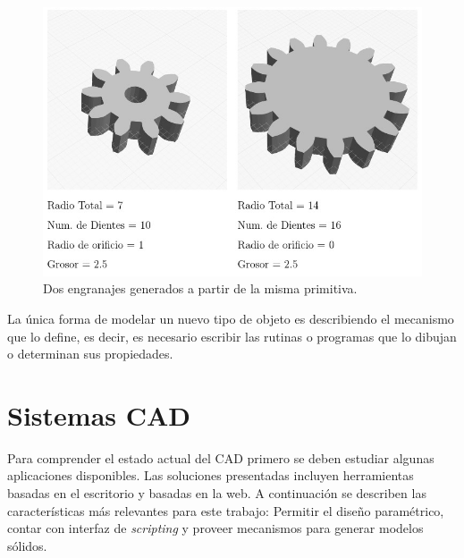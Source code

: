 \newline


\begin{figure}[h]
\includegraphics[width=12cm]{Img/Modelos/engranaje.jpg}
\centering
\caption{\footnotesize{Dos engranajes generados a partir de la misma primitiva.}}
\label{fig:csg4}
\end{figure}

La única forma de modelar un nuevo tipo de objeto es describiendo el mecanismo que lo define, es decir, es necesario escribir las rutinas o programas que lo dibujan o determinan sus propiedades.





\section{Sistemas CAD}
Para comprender el estado actual del CAD primero se deben estudiar algunas aplicaciones disponibles. 
Las soluciones presentadas incluyen herramientas basadas en el escritorio y basadas en la web. A continuación se describen las características más relevantes para este trabajo: Permitir el diseño paramétrico, contar con interfaz de \textit{scripting} y proveer mecanismos para generar modelos sólidos.


